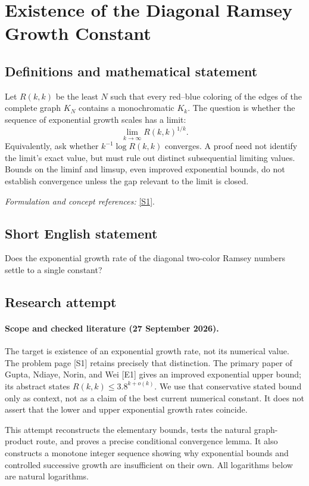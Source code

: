 \documentclass[11pt]{article}
\begin{document}
\section*{\texorpdfstring{Existence of the Diagonal Ramsey Growth Constant}{Existence of the Diagonal Ramsey Growth Constant}}\label{469}
\subsection{Definitions and mathematical statement}
Let $R(k,k)$ be the least $N$ such that every red--blue coloring of the edges of the complete graph $K_N$ contains a monochromatic $K_k$. The question is whether the sequence of exponential growth scales has a limit:
\[
 \lim_{k\to\infty}R(k,k)^{1/k}.
\]
Equivalently, ask whether $k^{-1}\log R(k,k)$ converges. A proof need not identify the limit's exact value, but must rule out distinct subsequential limiting values. Bounds on the liminf and limsup, even improved exponential bounds, do not establish convergence unless the gap relevant to the limit is closed.
\par\smallskip\textit{Formulation and concept references:} \href{https://www.erdosproblems.com/77}{[S1]}.

\subsection{Short English statement}
Does the exponential growth rate of the diagonal two-color Ramsey numbers settle to a single constant?
\subsection{Research attempt}
\paragraph{Scope and checked literature (27 September 2026).}
The target is existence of an exponential growth rate, not its numerical value. The problem page [S1] retains precisely that distinction. The primary paper of Gupta, Ndiaye, Norin, and Wei [E1] gives an improved exponential upper bound; its abstract states $R(k,k)\leq3.8^{k+o(k)}$. We use that conservative stated bound only as context, not as a claim of the best current numerical constant. It does not assert that the lower and upper exponential growth rates coincide.

This attempt reconstructs the elementary bounds, tests the natural graph-product route, and proves a precise conditional convergence lemma. It also constructs a monotone integer sequence showing why exponential bounds and controlled successive growth are insufficient on their own. All logarithms below are natural logarithms.
\end{document}

